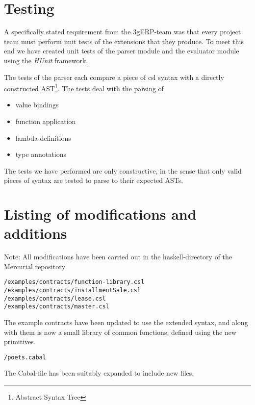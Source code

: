 \documentclass[10pt,a4paper,final,oneside,openany,article]{memoir}
\begin{document}

\section{Testing}
\label{tests}
A specifically stated requirement from the 3gERP-team was that every
project team must perform unit tests of the extensions that they
produce. To meet this end we have created unit tests of the parser
module and the evaluator module using the \emph{HUnit} framework.

The tests of the parser each compare a piece of csl syntax with a
directly constructed AST\footnote{Abstract Syntax Tree}.  The tests
deal with the parsing of

\begin{itemize}
  \item value bindings
  \item function application
  \item lambda definitions
  \item type annotations
\end{itemize}

The tests we have performed are only constructive, in the sense that
only valid pieces of syntax are tested to parse to their expected
ASTs.

\section{Listing of modifications and additions}

Note: All modifications have been carried out in the haskell-directory
of the Mercurial repository

\begin{verbatim}
/examples/contracts/function-library.csl
/examples/contracts/installmentSale.csl
/examples/contracts/lease.csl
/examples/contracts/master.csl
\end{verbatim}

The example contracts have been updated to use the extended syntax,
and along with them is now a small library of common functions,
defined using the new primitives.

\begin{verbatim}
/poets.cabal
\end{verbatim}

The Cabal-file has been suitably expanded to include new files.
\end{document}
